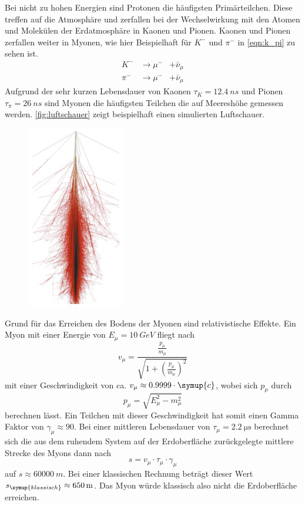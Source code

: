 Bei nicht zu hohen Energien sind Protonen die häufigsten Primärteilchen. Diese treffen auf die Atmosphäre und zerfallen bei der Wechselwirkung mit den Atomen und Molekülen der Erdatmosphäre in Kaonen und Pionen. Kaonen und Pionen zerfallen weiter in Myonen, wie hier Beispielhaft für $K^-$ und $\pi^-$ in \autoref{eqn:k_pi} zu sehen ist.
\begin{equation}
    \begin{aligned}
    \label{eqn:k_pi}
        K^- &\rightarrow \mu^- &+ \bar{\nu}_\mu \\
        \pi^- &\rightarrow \mu^- &+ \bar{\nu}_\mu
    \end{aligned}
\end{equation}
Aufgrund der sehr kurzen Lebensdauer von Kaonen $\tau_K = \SI{12.4}{ns}$ und Pionen $\tau_{\pi} = \SI{26}{ns}$ \cite{astro} sind Myonen die häufigsten Teilchen die auf Meereshöhe gemessen werden. \autoref{fig:luftschauer} zeigt beispielhaft einen simulierten Luftschauer. 
\begin{figure}[H]
 \centering
 \includegraphics[width=0.2\linewidth]{data/Luftschauer.png}
 \label{fig:luftschauer}
\end{figure}
\noindent
Grund für das Erreichen des Bodens der Myonen sind relativistische Effekte. Ein Myon mit einer Energie von $E_{\mu} = \SI{10}{GeV}$ fliegt nach 
\begin{equation}
    \label{eqn:t1}
    v_\mu = \frac{\frac{p_\mu}{m_\mu}}{\sqrt{1 + \left( \frac{p_\mu}{m_\mu} \right)^{2}}}
\end{equation}
mit einer Geschwindigkeit von ca. $v_{\mu} \approx 0.9999 \cdot \symup{c}$, wobei sich $p_\mu$ durch 
\begin{equation}
    p_\mu = \sqrt{E_\mu^2 - m_\mu^2}
\end{equation}
berechnen lässt.
Ein Teilchen mit dieser Geschwindigkeit hat somit einen Gamma Faktor von $\gamma_\mu \approx 90$. Bei einer mittleren Lebensdauer von $\tau_{\mu} = \SI{2.2}{\micro\second}$ \cite{pdg} berechnet sich die aus dem ruhendem System auf der Erdoberfläche zurückgelegte mittlere Strecke des Myons dann nach 
\begin{equation}
    \label{eqn:t2}
    s = v_{\mu} \cdot \tau_{\mu} \cdot \gamma_{\mu}
\end{equation}
auf $s \approx \SI{60000}{m}$. Bei einer klassischen Rechnung beträgt dieser Wert $s_{\symup{klassisch}} \approx \SI{650}{m}$. Das Myon würde klassisch also nicht die Erdoberfläche erreichen.
